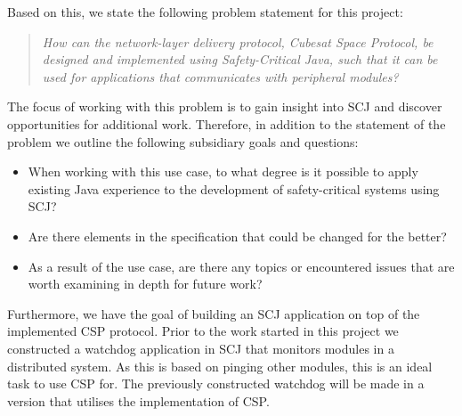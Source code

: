 Based on this, we state the following problem statement for this project:
\begin{quotation}
	\textit{How can the network-layer delivery protocol, Cubesat Space Protocol, be designed and implemented using Safety-Critical Java, such that it can be used for applications that communicates with peripheral modules?}
\end{quotation}
The focus of working with this problem is to gain insight into SCJ and discover opportunities for additional work. Therefore, in addition to the statement of the problem we outline the following subsidiary goals and questions:
\begin{itemize}
	\item When working with this use case, to what degree is it possible to apply existing Java experience to the development of safety-critical systems using SCJ?
	\item Are there elements in the specification that could be changed for the better?
	\item As a result of the use case, are there any topics or encountered issues that are worth examining in depth for future work?
\end{itemize}

Furthermore, we have the goal of building an SCJ application on top of the implemented CSP protocol. Prior to the work started in this project we constructed a watchdog application in SCJ that monitors modules in a distributed system. As this is based on pinging other modules, this is an ideal task to use CSP for. The previously constructed watchdog will be made in a version that utilises the implementation of CSP.